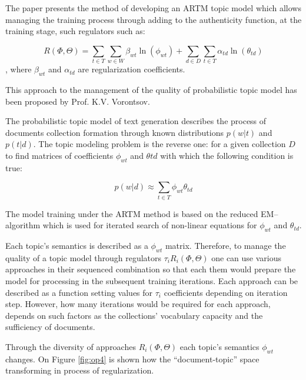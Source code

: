 \documentclass[12pt]{report}
\theoremstyle{definition}
\begin{document}
The paper \cite{voron2013mod} presents the method of developing an ARTM topic model which allows managing the training process through adding to the authenticity function, at the training stage, such regulators such as:

\begin{equation} 
\label{eq:op2}
R\left( \Phi ,  \Theta \right) = \sum_{t \in T } \sum_{w \in W}  \beta_{wt} \ln \left( \phi_{wt}\right) + \sum_{d \in D} \sum_{t \in T} \alpha_{td} \ln \left( \theta_{td} \right)
\end{equation},
where $\beta_{wt}$ and $\alpha_{td}$ are regularization coefficients.

This approach to the management of the quality of probabilistic topic model has been proposed by Prof. K.V. Vorontsov. 

The probabilistic topic model of text generation describes the process of documents collection formation through known distributions $p \left(w \vert t \right)$ and $p \left( t \vert d \right)$. 
The topic modeling problem is the reverse one: for a given collection $D$ to find matrices of coefficients $\phi_{wt} $ and $\theta{td} $ with which the following condition is true:

\begin{equation} \label{eq:op3}
p \left( w \vert d \right)  \approx \sum_{t \in T} \phi_{wt}  \theta_{td}
\end{equation}

The model training under the ARTM method is based on the reduced EM--algorithm which is used for iterated search of non-linear equations for $\phi_{wt}$ and $\theta_{td}$. 

Each topic's semantics is described as a $\phi_{wt}$ matrix. 
Therefore, to manage the quality of a topic model through regulators $\tau_i R_i \left(\Phi , \Theta \right)$ one can use various approaches in their sequenced combination so that each them would prepare the model for processing in the subsequent training iterations. 
Each approach can be described as a function setting values for $\tau_i$ coefficients depending on iteration step.  
However, how many iterations would be required for each approach, depends on such factors as the collections' vocabulary capacity and the sufficiency of documents.

Through the diversity of approaches $R_i \left( \Phi , \Theta \right)$ each topic's semantics $\phi_{wt}$  changes. On Figure \ref{fig:op4} is shown how the ``document-topic'' space transforming  in process of regularization.
\end{document}
